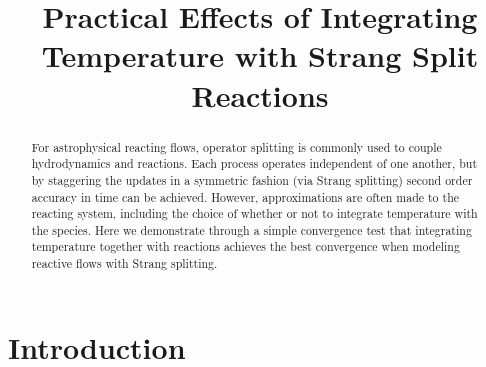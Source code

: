 \documentclass[times,preprint]{aastex63}
\begin{document}
\title{Practical Effects of Integrating Temperature with Strang Split Reactions}



\shortauthors{}






\begin{abstract}
For astrophysical reacting flows, operator splitting is commonly used
to couple hydrodynamics and reactions.  Each process operates
independent of one another, but by staggering the updates in a
symmetric fashion (via Strang splitting) second order accuracy in time
can be achieved.  However, approximations are often made to the
reacting system, including the choice of whether or not to integrate
temperature with the species.  Here we demonstrate through a simple
convergence test that integrating temperature together with reactions
achieves the best convergence when modeling reactive flows with Strang
splitting.
\end{abstract}


\section{Introduction}\label{Sec:Introduction}
\end{document}
